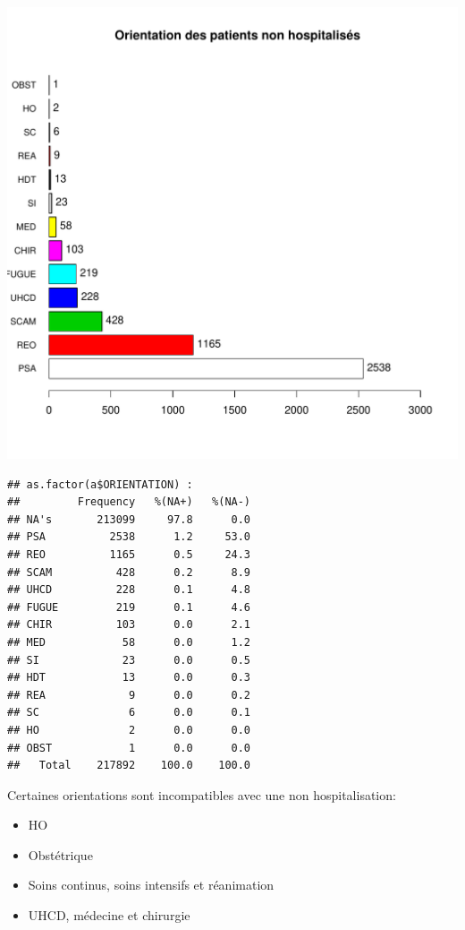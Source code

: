 \documentclass[12pt,english,french,twoside]{report}\usepackage[]{graphicx}\usepackage[]{color}
\makeatletter
\def\maxwidth{ %
  \ifdim\Gin@nat@width>\linewidth
    \linewidth
  \else
    \Gin@nat@width
  \fi
}
\newenvironment{kframe}{%
 \def\at@end@of@kframe{}%
 \ifinner\ifhmode%
  \def\at@end@of@kframe{\end{minipage}}%
  \begin{minipage}{\columnwidth}%
 \fi\fi%
 \def\FrameCommand##1{\hskip\@totalleftmargin \hskip-\fboxsep
 \colorbox{shadecolor}{##1}\hskip-\fboxsep
     \hskip-\linewidth \hskip-\@totalleftmargin \hskip\columnwidth}%
 \MakeFramed {\advance\hsize-\width
   \@totalleftmargin\z@ \linewidth\hsize
   \@setminipage}}%
 {\par\unskip\endMakeFramed%
 \at@end@of@kframe}
\newenvironment{knitrout}{}{} %
\makeatother
\begin{document}
\begin{knitrout}
\includegraphics[width=\maxwidth]{figure/fausses_sorties} 
\begin{kframe}\begin{verbatim}
## as.factor(a$ORIENTATION) : 
##         Frequency   %(NA+)   %(NA-)
## NA's       213099     97.8      0.0
## PSA          2538      1.2     53.0
## REO          1165      0.5     24.3
## SCAM          428      0.2      8.9
## UHCD          228      0.1      4.8
## FUGUE         219      0.1      4.6
## CHIR          103      0.0      2.1
## MED            58      0.0      1.2
## SI             23      0.0      0.5
## HDT            13      0.0      0.3
## REA             9      0.0      0.2
## SC              6      0.0      0.1
## HO              2      0.0      0.0
## OBST            1      0.0      0.0
##   Total    217892    100.0    100.0
\end{verbatim}
\end{kframe}
\end{knitrout}

Certaines orientations sont incompatibles avec une non hospitalisation:
\begin{itemize}
  \item HO
  \item Obstétrique
  \item Soins continus, soins intensifs et réanimation
  \item UHCD, médecine et chirurgie
  
\end{itemize}
\end{document}
